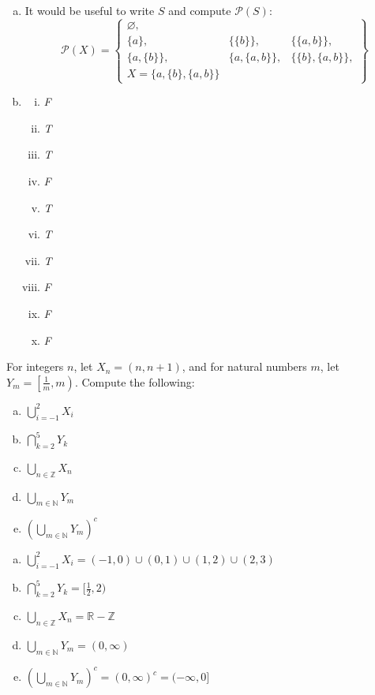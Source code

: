 \documentclass[11pt,letterpaper]{article}
\begin{document}
\sol
\begin{enumerate}[(a)]
\item 
 It would be useful to write $S$ and compute $\mathcal{P}(S)$:
	\[
	\mathcal{P}(X)= 
	\left\{
	\begin{matrix}
	\varnothing, \\
	\{ a \}, & \{ \{ b \} \}, & \{ \{ a, b \} \}, \\
	\{ a, \{ b \} \}, & \{ a, \{ a, b \} \}, & \{ \{ b \}, \{ a, b \} \}, \\
	X= \{ a, \{ b \}, \{ a, b \} \}
	\end{matrix}
	\right\}
	\] \pspace

\item 
	\begin{multicols}{2}
	\begin{enumerate}[(i)]
	\item \textit{F}
	\item \textit{T}
	\item \textit{T}
	\item \textit{F}
	\item \textit{T}
	\item \textit{T}
	\item \textit{T}
	\item \textit{F}
	\item \textit{F}
	\item \textit{F}
	\end{enumerate}
	\end{multicols}
\end{enumerate}



\newpage



 For integers $n$, let $X_n= (n, n + 1)$, and for natural numbers $m$, let $Y_m= \left[ \frac{1}{m}, m \right)$. Compute the following:
	\begin{enumerate}[(a)]
	\item $\displaystyle \bigcup_{i= -1}^2 X_i$
	\item $\displaystyle \bigcap_{k=2}^5 Y_k$
	\item $\displaystyle \bigcup_{n \in \mathbb{Z}} X_n$
	\item $\displaystyle \bigcup_{m \in \mathbb{N}} Y_m$
	\item $\displaystyle \left( \bigcup_{m \in \mathbb{N}} Y_m \right)^c$
	\end{enumerate} \pspace

\sol 
\begin{enumerate}[(a)]
\item $\displaystyle \bigcup_{i= -1}^2 X_i= (-1, 0) \cup (0, 1) \cup (1, 2) \cup (2, 3)$
\item $\displaystyle \bigcap_{k=2}^5 Y_k= [ \tfrac{1}{2}, 2)$
\item $\displaystyle \bigcup_{n \in \mathbb{Z}} X_n= \mathbb{R} - \mathbb{Z}$
\item $\displaystyle \bigcup_{m \in \mathbb{N}} Y_m= (0, \infty)$
\item $\displaystyle \left( \bigcup_{m \in \mathbb{N}} Y_m \right)^c= (0, \infty)^c= (-\infty, 0]$
\end{enumerate}
\end{document}
